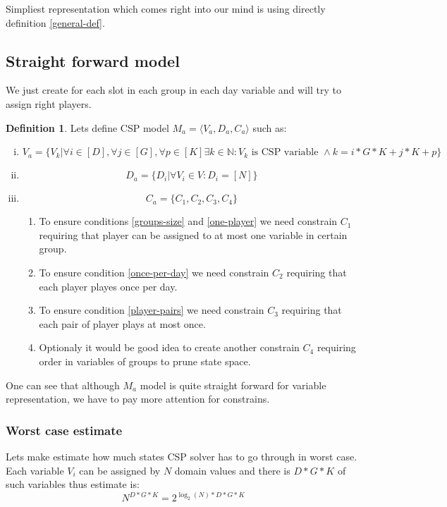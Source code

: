 \documentclass[a4paper]{article}
\theoremstyle{definition}
\newtheorem{definition}{Definition}[section]
\theoremstyle{remark}
\newcommand{\mdef}[2]{
	\theoremstyle{definition}
	\begin{definition}{#1}
	#2
	\end{definition}
}
\begin{document}
Simpliest representation which comes right into our mind is using directly definition \ref{general-def}.

\subsection{Straight forward model}
We just create for each slot in each group in each day variable and will try to assign right players.

\mdef{}{ Lets define CSP model $M_a = \langle V_a,D_a,C_a \rangle$ such as:
	\begin{enumerate}[(i)]
		\item $$ V_a = \{V_k|  \forall i \in [D], \forall j \in [G], \forall p \in [K] \exists k \in \mathbb{N}: V_k \text{ is CSP variable } \land  k=i*G*K+j*K+p \} $$
		\item $$ D_a = \{D_i| \forall V_i \in V: D_i = [N] \} $$
		\item $$ C_a = \{ C_1, C_2, C_3, C_4\} $$
		\begin{enumerate}
			\item To ensure conditions \ref{groups-size} and \ref{one-player} we need constrain $C_1$ requiring that player can be assigned to at most one variable in certain group.
			\item To ensure condition \ref{once-per-day} we need constrain $C_2$ requiring that each player playes once per day. 
			\item To ensure condition \ref{player-pairs} we need constrain $C_3$ requiring that each pair of player plays at most once.
			\item Optionaly it would be good idea to create another constrain $C_4$ requiring order in variables of groups to prune state space.
		\end{enumerate}
	\end{enumerate}
}


One can see that although $M_a$ model is quite straight forward for variable representation,
we have to pay more attention for constrains. 

\subsubsection{Worst case estimate}

Lets make estimate how much states CSP solver has to go through in worst case.
Each variable $V_i$ can be assigned by $N$ domain values and there is 
$D*G*K$ of such variables thus estimate is:
$$N^{D*G*K} = 2^{\log_2{(N)}*D*G*K}$$
\end{document}
